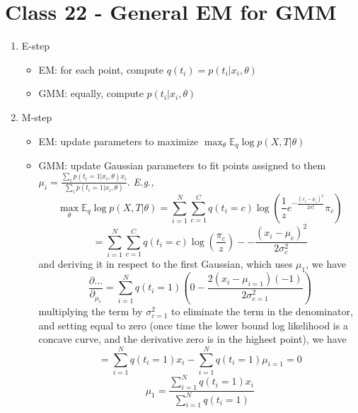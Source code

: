 \documentclass{article}
\newcommand{\Eg}{\textit{E.g.,}}
\begin{document}
\section{Class 22 - General EM for GMM}
\begin{enumerate}
    \item E-step \begin{itemize}
        \item EM: for each point, compute $q(t_i) = p(t_i|x_i, \theta)$
        \item GMM: equally, compute $p(t_i|x_i, \theta)$
    \end{itemize}
    \item M-step \begin{itemize}
        \item EM: update parameters to maximize $\max_\theta \mathbb{E}_q \log p(X, T|\theta)$
        \item GMM: update Gaussian parameters to fit points assigned to them $\mu_i = \frac{\sum_i p(t_i = 1| x_i, \theta)x_i}{\sum_i p(t_i = 1| x_i, \theta)}$. \Eg
        \begin{equation}
            \max_\theta \mathbb{E}_q \log p(X, T|\theta) = \sum_{i=1}^N \sum_{c=1}^C q(t_i = c) \log \left(
            \frac{1}{z} e^{-\frac{(x_i-\mu_c)^2}{2\sigma_c^2}}\pi_c
            \right)
        \end{equation}
        \begin{equation}
            = \sum_{i=1}^N \sum_{c=1}^C q(t_i = c) \log(\frac{\pi_c}{z}) - -\frac{(x_i-\mu_c)^2}{2\sigma_c^2}
        \end{equation}
        and deriving it in respect to the first Gaussian, which uses $\mu_1$, we have
        \begin{equation}
            \frac{\partial...}{\partial_{\mu_c}} = \sum_{i=1}^N q(t_i = 1) (0 - \frac{2(x_i - \mu_{i=1})(-1)}{2\sigma_{c=1}^2})
        \end{equation}
        multiplying the term by $\sigma_{c=1}^2$ to eliminate the term in the denominator, and setting equal to zero (once time the lower bound log likelihood is a concave curve, and the derivative zero is in the highest point), we have
        \begin{equation}
            = \sum_{i=1}^N q(t_i = 1)x_i - \sum_{i=1}^N q(t_i = 1)\mu_{i=1} = 0
        \end{equation}
        \begin{equation}
            \mu_1 = \frac{\sum_{i=1}^N q(t_i = 1)x_i}{\sum_{i=1}^N q(t_i = 1)}
        \end{equation}

\end{itemize}
\end{enumerate}
\end{document}
